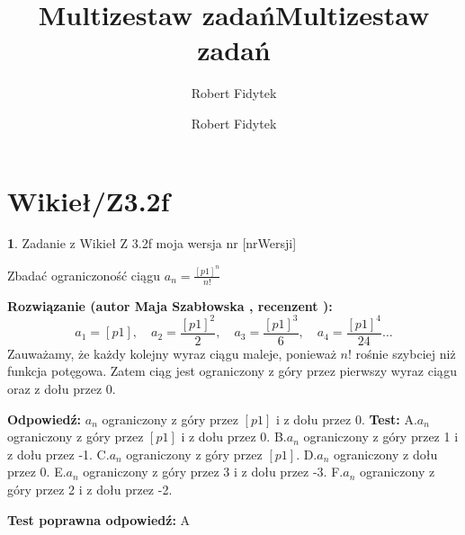 \documentclass[12pt, a4paper]{article}
\title{Multizestaw zadań}
\author{Robert Fidytek}
\date{}\documentclass[12pt, a4paper]{article}
\title{Multizestaw zadań}
\author{Robert Fidytek}
\date{}
\theoremstyle{definition} %
\newtheorem{zad}{}
\theoremstyle{definition} %
\newtheorem{zad}{}
\newcommand{\kategoria}[1]{\section{#1}} %
\newcommand{\zadStart}[1]{\begin{zad}#1\newline} %
\newcommand{\zadStop}{\end{zad}}   %
\newcommand{\rozwStart}[2]{\noindent \textbf{Rozwiązanie (autor #1 , recenzent #2): }\newline} %
\newcommand{\rozwStop}{\newline}                                            %
\newcommand{\odpStart}{\noindent \textbf{Odpowiedź:}\newline}    %
\newcommand{\odpStop}{\newline}                                             %
\newcommand{\testStart}{\noindent \textbf{Test:}\newline} %
\newcommand{\testStop}{\newline} %
\newcommand{\kluczStart}{\noindent \textbf{Test poprawna odpowiedź:}\newline} %
\newcommand{\kluczStop}{\newline} %
\begin{document}
\maketitle


\kategoria{Wikieł/Z3.2f}
\zadStart{Zadanie z Wikieł Z 3.2f moja wersja nr [nrWersji]}


Zbadać ograniczoność ciągu $a_{n}=\frac{[p1]^{n}}{n!}$

\zadStop

\rozwStart{Maja Szabłowska}{}
$$a_{1}=[p1], \quad a_{2}=\frac{[p1]^{2}}{2}, \quad a_{3}=\frac{[p1]^{3}}{6}, \quad a_{4}=\frac{[p1]^{4}}{24} \ldots$$
Zauważamy, że każdy kolejny wyraz ciągu maleje, ponieważ $n!$ rośnie szybciej niż funkcja potęgowa. Zatem ciąg jest ograniczony z góry przez pierwszy wyraz ciągu oraz z dołu przez 0.
\rozwStop


\odpStart
$a_{n}$ ograniczony z góry przez $[p1]$ i z dołu przez 0.
\odpStop
\testStart
A.$a_{n}$ ograniczony z góry przez $[p1]$ i z dołu przez 0.
B.$a_{n}$ ograniczony z góry przez 1 i z dołu przez -1.
C.$a_{n}$ ograniczony z góry przez $[p1]$.
D.$a_{n}$ ograniczony z dołu przez 0.
E.$a_{n}$ ograniczony z góry przez 3 i z dołu przez -3.
F.$a_{n}$ ograniczony z góry przez 2 i z dołu przez -2.


\testStop
\kluczStart
A
\kluczStop
\end{document}
